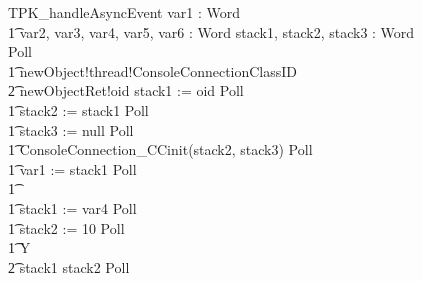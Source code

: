 \begin{figure}[tp!]
  \centering
  \setlength{\zedtab}{0.5cm}
  \setlength{\zedindent}{0pt}
  \setlength{\zedleftsep}{0pt}
  \setlength{\abovedisplayskip}{0pt}
  \setlength{\belowdisplayskip}{0pt}
  \setlength{\abovedisplayshortskip}{0pt}
  \setlength{\belowdisplayshortskip}{0pt}
  \begin{circusaction}
    TPK\_handleAsyncEvent \circdef \circval var1 : Word \circspot \\
    \t1 \circvar var2, var3, var4, var5, var6 : Word \circspot \circvar stack1, stack2, stack3 : Word \circspot Poll \circseq \\
    \t1 newObject!thread!ConsoleConnectionClassID \\
    \t2 {} \then  newObjectRet!oid \then stack1 := oid \circseq Poll \circseq \\
    \t1 stack2 := stack1 \circseq Poll \circseq \\
    \t1 stack3 := null \circseq Poll \circseq \\
    \t1 ConsoleConnection\_CCinit(stack2, stack3) \circseq Poll \circseq \\
    \t1 var1 := stack1 \circseq Poll \circseq \\
    \t1 {} \cdots {} \\
    \t1 stack1 := var4 \circseq Poll \circseq \\
    \t1 stack2 := 10 \circseq Poll \circseq \\
    \t1 \circmu Y \circspot \\
    \t2 \circif stack1 \leq stack2 \circthen Poll \circseq \\

\end{circusaction}
\end{figure}
